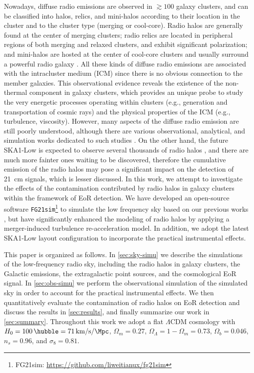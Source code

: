 \documentclass[modern]{aastex62}
\newcommand{\lcdm}{$\Lambda$CDM}
\begin{document}
Nowadays, diffuse radio emissions are observed in $\gtrsim 100$ galaxy
clusters, and can be classified into halos, relics, and mini-halos
according to their location in the cluster and to the cluster type
(merging or cool-core).
Radio halos are generally found at the center of merging clusters;
radio relics are located in peripheral regions of both merging and
relaxed clusters, and exhibit significant polarization;
and mini-halos are hosted at the center of cool-core clusters and
usually surround a powerful radio galaxy \citep{feretti2012rev}.
All these kinds of diffuse radio emissions are associated with the
intracluster medium (ICM) since there is no obvious connection to
the member galaxies.
This observational evidence reveals the existence of the non-thermal
component in galaxy clusters, which provides an unique probe to study
the very energetic processes operating within clusters (e.g., generation
and transportation of cosmic rays)
and the physical properties of the ICM (e.g., turbulence, viscosity).
However, many aspects of the diffuse radio emission are still poorly
understood, although there are various observational, analytical, and
simulation works dedicated to such studies
\citep[see][for a recent review]{brunetti2014rev}.
On the other hand, the future SKA1-Low is expected to observe several
thousands of radio halos \citep{cassano2015}, and there are much more
fainter ones waiting to be discovered, therefore the cumulative emission
of the radio halos may pose a significant impact on the detection of
21~cm signals, which is lesser discussed.
In this work, we attempt to investigate the effects of the contamination
contributed by radio halos in galaxy clusters within the framework of
EoR detection.
We have developed an open-source software
\texttt{FG21sim}\footnote{FG21sim: \url{https://github.com/liweitianux/fg21sim}}
to simulate the low frequency sky based on our previous works
\citep{wang2010,wang2013}, but have significantly enhanced the modeling
of radio halos by applying a merger-induced turbulence re-acceleration model.
In addition, we adopt the latest SKA1-Low layout configuration to
incorporate the practical instrumental effects.

This paper is organized as follows.
In \autoref{sec:sky-simu} we describe the simulations of the low-frequency
radio sky, including the radio halos in galaxy clusters, the Galactic
emissions, the extragalactic point sources, and the cosmological EoR signal.
In \autoref{sec:obs-simu} we perform the observational simulation of the
simulated sky in order to account for the practical instrumental effects.
We then quantitatively evaluate the contamination of radio halos on EoR
detection and discuss the results in \autoref{sec:results},
and finally summarize our work in \autoref{sec:summary}.
Throughout this work we adopt a flat \lcdm{} cosmology with
$H_0 = \SI{100}{\hubble} = \SI{71}{\km\per\second\per\Mpc}$,
$\Omega_m = 0.27$, $\Omega_{\Lambda} = 1 - \Omega_m = 0.73$,
$\Omega_b = 0.046$, $n_s = 0.96$, and $\sigma_8 = 0.81$.
\end{document}
